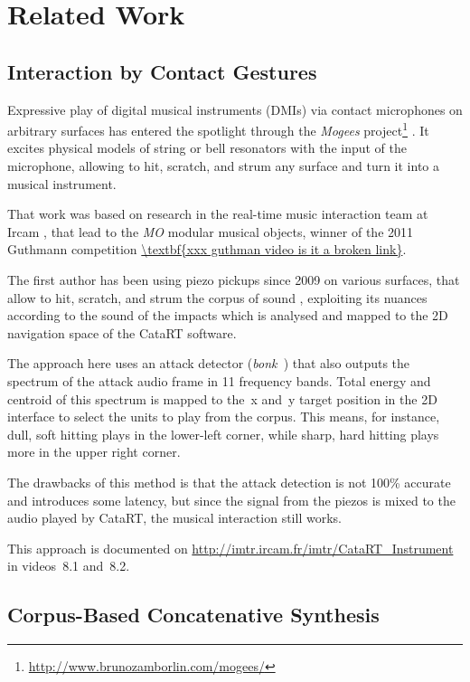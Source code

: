 \section{Related Work}

\subsection{Interaction by Contact Gestures}


Expressive play of digital musical instruments (DMIs) via contact microphones on arbitrary surfaces has entered the spotlight through the \textit{Mogees} project\footnote{\url{http://www.brunozamborlin.com/mogees/}}  \cite{Zamborlin14a}.  It excites physical models of string or bell resonators with the input of the microphone, allowing to hit, scratch, and strum any surface and turn it into a musical instrument.  


That work was based on research in the real-time music interaction team at Ircam \cite{Rasamimanana11a,Bevilacqua11b,Zamborlin14a}, that lead to the \textit{MO} modular musical objects, winner of the 2011 Guthmann competition \url{\textbf{xxx guthman video is it a broken link}}.


The first author has been using piezo pickups since 2009 on various surfaces, that allow to hit, scratch, and strum the corpus of sound \cite{Schwarz-nime2012-sound-space}, exploiting
its nuances according to the sound of the impacts which is analysed and mapped to
the 2D navigation space of the CataRT software.


The approach here uses an attack detector (\textit{bonk~}) that also outputs the spectrum of the
attack audio frame in 11 frequency bands.  Total energy and centroid of this spectrum is mapped to
the~x and~y target position in the 2D interface to select the units to play from the corpus.
This means, for instance, dull, soft hitting plays in the lower-left corner, while sharp, hard hitting plays more in the upper right corner.


The drawbacks of this method is that the attack detection is not 100\% accurate and introduces some latency, but since the signal from the piezos is mixed to the
audio played by CataRT, the musical interaction still works.


This approach is documented on \url{http://imtr.ircam.fr/imtr/CataRT_Instrument} in videos~8.1 and~8.2.


\subsection{Corpus-Based Concatenative Synthesis}


